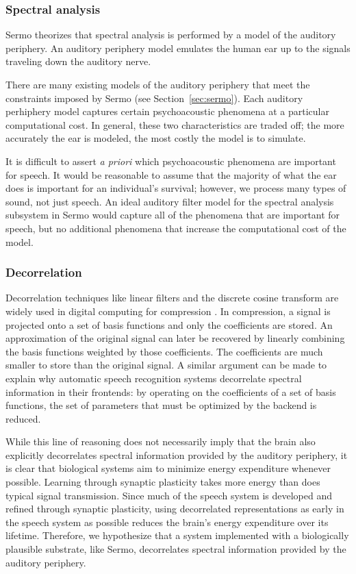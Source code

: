 \subsubsection{Spectral analysis}

Sermo theorizes that spectral analysis
is performed by a model
of the auditory periphery.
An auditory periphery model
emulates the human ear
up to the signals
traveling down the auditory nerve.

There are many existing
models of the auditory periphery
that meet the constraints
imposed by Sermo (see Section~\ref{sec:sermo}).
Each auditory perhiphery model
captures certain psychoacoustic phenomena
at a particular computational cost.
In general, these two characteristics
are traded off;
the more accurately the ear is modeled,
the most costly the model is to simulate.

It is difficult to assert \textit{a priori}
which psychoacoustic phenomena
are important for speech.
It would be reasonable to assume that
the majority of what the ear does
is important for an individual's survival;
however, we process many types of sound,
not just speech.
An ideal auditory filter model
for the spectral analysis subsystem
in Sermo
would capture all of the phenomena
that are important for speech,
but no additional phenomena
that increase the computational cost
of the model.

\subsubsection{Decorrelation}

Decorrelation techniques like
linear filters and the discrete cosine transform
are widely used in digital computing
for compression \citep{khayam2003}.
In compression, a signal is projected
onto a set of basis functions
and only the coefficients are stored.
An approximation of the original signal
can later be recovered by linearly combining
the basis functions weighted by those coefficients.
The coefficients are much smaller
to store than the original signal.
A similar argument can be made
to explain why automatic speech recognition systems
decorrelate spectral information in their frontends:
by operating on the coefficients of a set
of basis functions,
the set of parameters that must be optimized
by the backend is reduced.

While this line of reasoning
does not necessarily imply that
the brain also explicitly decorrelates
spectral information
provided by the auditory periphery,
it is clear that biological systems
aim to minimize energy expenditure whenever possible.
Learning through synaptic plasticity
takes more energy than does
typical signal transmission.
Since much of the speech system
is developed and refined
through synaptic plasticity,
using decorrelated representations
as early in the speech system as possible
reduces the brain's energy expenditure
over its lifetime.
Therefore, we hypothesize
that a system implemented
with a biologically plausible substrate,
like Sermo,
decorrelates spectral information
provided by the auditory periphery.

